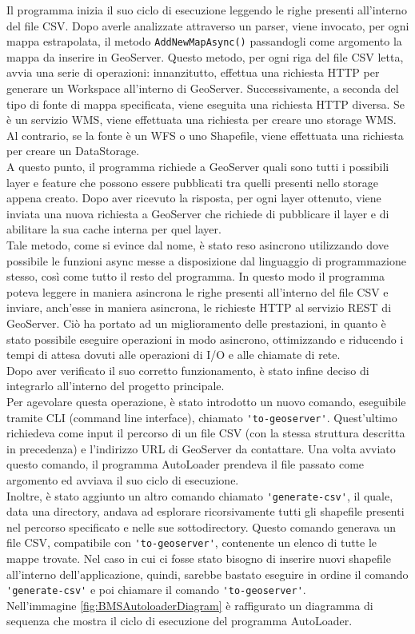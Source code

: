 Il programma inizia il suo ciclo di esecuzione leggendo le righe presenti all'interno del file CSV. Dopo averle analizzate attraverso un parser, viene invocato, per ogni mappa estrapolata, il metodo \verb|AddNewMapAsync()|  passandogli come argomento la mappa da inserire in GeoServer. Questo metodo, per ogni riga del file CSV letta, avvia una serie di operazioni: innanzitutto, effettua una richiesta HTTP per generare un Workspace all'interno di GeoServer. Successivamente, a seconda del tipo di fonte di mappa specificata, viene eseguita una richiesta HTTP diversa. Se è un servizio WMS, viene effettuata una richiesta per creare uno storage WMS. Al contrario, se la fonte è un WFS o uno Shapefile, viene effettuata una richiesta per creare un DataStorage. 
\\A questo punto, il programma richiede a GeoServer quali sono tutti i possibili layer e feature che possono essere pubblicati tra quelli presenti nello storage appena creato. Dopo aver ricevuto la risposta, per ogni layer ottenuto, viene inviata una nuova richiesta a GeoServer che richiede di pubblicare il layer e di abilitare la sua cache interna per quel layer.
\\Tale metodo, come si evince dal nome, è stato reso asincrono utilizzando dove possibile le funzioni async messe a disposizione dal linguaggio di programmazione stesso, così come tutto il resto del programma. In questo modo il programma poteva leggere in maniera asincrona le righe presenti all'interno del file CSV e inviare, anch'esse in maniera asincrona, le richieste HTTP al servizio REST di GeoServer. Ciò ha portato ad un miglioramento delle prestazioni, in quanto è stato possibile eseguire operazioni in modo asincrono, ottimizzando e riducendo i tempi di attesa dovuti alle operazioni di I/O e alle chiamate di rete.
\medskip
\\Dopo aver verificato il suo corretto funzionamento, è stato infine deciso di integrarlo all'interno del progetto principale. 
\\Per agevolare questa operazione, è stato introdotto un nuovo comando, eseguibile tramite CLI (command line interface), chiamato \verb|'to-geoserver'|. Quest'ultimo richiedeva come input il percorso di un file CSV (con la stessa struttura descritta in precedenza) e l'indirizzo URL di GeoServer da contattare. Una volta avviato questo comando, il programma AutoLoader prendeva il file passato come argomento ed avviava il suo ciclo di esecuzione.
\\Inoltre, è stato aggiunto un altro comando chiamato \verb|'generate-csv'|, il quale, data una directory, andava ad esplorare ricorsivamente tutti gli shapefile presenti nel percorso specificato e nelle sue sottodirectory. Questo comando generava un file CSV, compatibile con \verb|'to-geoserver'|, contenente un elenco di tutte le mappe trovate. Nel caso in cui ci fosse stato bisogno di inserire nuovi shapefile all'interno dell'applicazione, quindi, sarebbe bastato eseguire in ordine il comando \verb|'generate-csv'| e poi chiamare il comando \verb|'to-geoserver'|.
\\Nell'immagine \ref{fig:BMSAutoloaderDiagram} è raffigurato un diagramma di sequenza che mostra il ciclo di esecuzione del programma AutoLoader.


